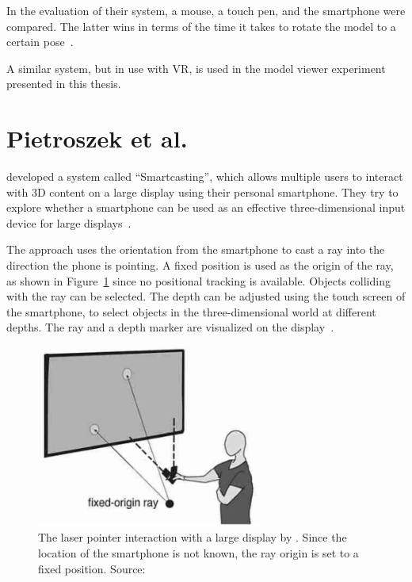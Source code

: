 In the evaluation of their system, a mouse, a touch pen, and the smartphone were compared. The latter wins in terms of the time it takes to rotate the model to a certain pose~\cite[140]{Katzakis.2010}.

A similar system, but in use with \gls{VR}, is used in the model viewer experiment presented in this thesis.

\section{Pietroszek et al.\@}\label{section:pietroszek-2014}
\citeauthor{Pietroszek.2014} developed a system called \enquote{Smartcasting}, which allows multiple users to interact with 3D content on a large display using their personal smartphone. They try to explore whether a smartphone can be used as an effective three-dimensional input device for large displays~\cite[119]{Pietroszek.2014}.

The approach uses the orientation from the smartphone to cast a ray into the direction the phone is pointing. A fixed position is used as the origin of the ray, as shown in Figure~\ref{fig:pietroszek-2014} since no positional tracking is available. Objects colliding with the ray can be selected. The depth can be adjusted using the touch screen of the smartphone, to select objects in the three-dimensional world at different depths. The ray and a depth marker are visualized on the display~\cite[121]{Pietroszek.2014}.

\begin{figure}[H]%
  \centering%
  \includegraphics[height=6cm]{figures/related_work/pietroszek_2014_laser_pointer.png}%
  \caption[Laser pointer implementation by Pietroszek et al.\@]{
  The laser pointer interaction with a large display by \citeauthor{Pietroszek.2014}. Since the location of the smartphone is not known, the ray origin is set to a fixed position.
  \newline{}
  Source:~\cite[Figure 3]{Pietroszek.2014}}\label{fig:pietroszek-2014}
\end{figure}

